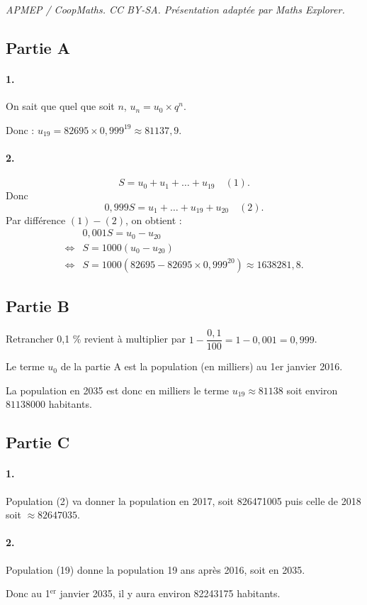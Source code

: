 \documentclass[10pt]{article}
\begin{document}
\noindent\textit{APMEP / CoopMaths. CC BY-SA. Présentation adaptée par Maths Explorer.}\par\medskip
\subsection*{Partie A}

\paragraph{1.} On sait que quel que soit \(n\), \( u_n = u_0 \times q^n \).

Donc : \(u_{19} = 82695 \times 0{,}999^{19} \approx 81137{,}9\).

\paragraph{2.}
\[
S = u_0 + u_1 + \dots + u_{19} \quad (1).
\]
Donc
\[
0{,}999S = u_1 + \dots + u_{19} + u_{20} \quad (2).
\]
Par différence \((1) - (2)\), on obtient :
\begin{align*}
&0{,}001S = u_0 - u_{20} \\
\iff &S = 1000(u_0 - u_{20}) \\
\iff &S = 1000(82695 - 82695 \times 0{,}999^{20}) \approx 1638281{,}8.
\end{align*}

\subsection*{Partie B}

Retrancher 0{,}1 \% revient à multiplier par \(1 - \dfrac{0{,}1}{100} = 1 - 0{,}001 = 0{,}999\).

Le terme \(u_0\) de la partie A est la population (en milliers) au 1er janvier 2016.

La population en 2035 est donc en milliers le terme \(u_19 \approx 81138 \) soit environ \(81138000\) habitants.

\subsection*{Partie C}

\paragraph{1.} Population (2) va donner la population en 2017, soit 826471005 puis celle de 2018 soit \( \approx 82647035 \).

\paragraph{2.} Population (19) donne la population 19 ans après 2016, soit en 2035. 
    
Donc au 1\(^\text{er}\) janvier 2035, il y aura environ 82243175 habitants.
\end{document}
